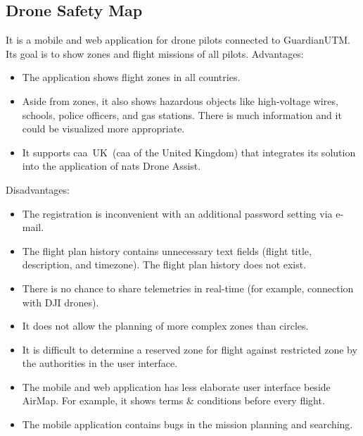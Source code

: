 \subsection{Drone Safety Map}\label{subsec:drone-safety-map}
It is a mobile and web application for drone pilots connected to GuardianUTM.
Its goal is to show zones and flight missions of all pilots.
\newline
\newline
Advantages:
\begin{itemize}
    \item The application shows flight zones in all countries.
    \item Aside from zones, it also shows hazardous objects like high-voltage wires, schools, police officers, and gas stations.
    There is much information and it could be visualized more appropriate.
    \item It supports \acrshort{caa}~UK~(\acrlong{caa} of the United Kingdom) that integrates its solution into the application of \acrshort{nats} Drone Assist.~\cite{droneAssist}
\end{itemize}
Disadvantages:
\begin{itemize}
    \item The registration is inconvenient with an additional password setting via e-mail.
    \item The flight plan history contains unnecessary text fields (flight title, description, and timezone).
    The flight plan history does not exist.
    \item There is no chance to share telemetries in real-time (for example, connection with DJI drones).
    \item It does not allow the planning of more complex zones than circles.
    \item It is difficult to determine a reserved zone for flight against restricted zone by the authorities in the user interface.
    \item The mobile and web application has less elaborate user interface beside AirMap.
    For example, it shows terms \& conditions before every flight.
    \item The mobile application contains bugs in the mission planning and searching.
\end{itemize}

